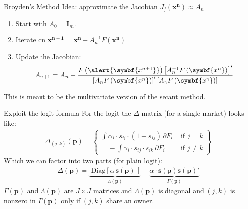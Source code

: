 \documentclass[aspectratio=169,10pt]{beamer}
\begin{document}
\begin{frame}{Broyden's Method}
Idea: approximate the Jacobian $J_f(\symbf{x^n}) \approx A_n$
\begin{enumerate}
\item Start with $A_0 = \symbf{I}_m$.
\item Iterate on $\symbf{x^{n+1}}= \symbf{x^n} - A_n^{-1} F\left(\symbf{x^{n}}\right)$
\item Update the Jacobian:
\begin{align*}
A_{n+1}=A_{n}-\frac{F\left(\alert{\symbf{x^{n+1}}}\right)\left[A_{n}^{-1}  F\left(\symbf{x^{n}}\right) \right]^{\prime}}{\left[A_{n} F\left(\symbf{x^{n}}\right) \right]^{\prime}\left[A_{n} F\left(\symbf{x^{n}}\right) \right]}
\end{align*}
\end{enumerate}
This is meant to be the multivariate version of the \alert{secant method}.
\end{frame} 


\begin{frame}{Exploit the logit formula}
For the logit the $\Delta$ matrix (for a single market) looks like:
\begin{align*}
\Delta_{(j,k)}(\symbf{p}) = \left\{\begin{array}{lr}
       \int \alpha_i \cdot s_{ij}\cdot (1-s_{ij}) \, \partial F_i& \text{ if } j=k \\
       	  \quad -\int \alpha_i \cdot s_{ij} \cdot s_{ik} \, \partial F_i &  \text{ if }  j\neq k 
        \end{array} \right\}
\end{align*}
Which we can factor into two parts (for plain logit):
\begin{align*}
\Delta(\symbf{p}) =  \underbrace{\text{ Diag}\left[ \alpha \, \symbf{s}(\symbf{p}) \, \right]}_{\Lambda(\symbf{p})} -  \underbrace{\alpha \cdot \symbf{s}(\symbf{p}) \symbf{s}(\symbf{p})'}_{\Gamma(\symbf{p})}
\end{align*}
$\Gamma(\symbf{p})$ and $\Lambda(\symbf{p})$ are $J \times J$ matrices and $\Lambda(\symbf{p})$ is diagonal and $(j,k)$ is nonzero in $\Gamma(\symbf{p})$ only if $(j,k)$ share an owner.
\end{frame}
\end{document}
